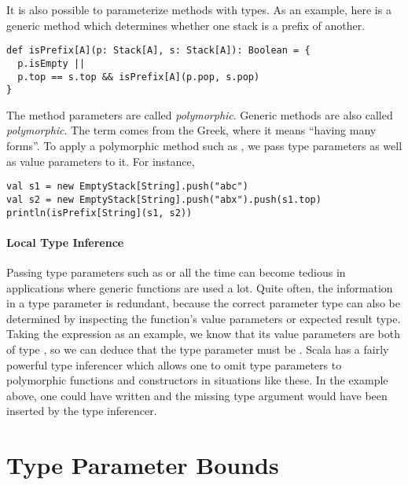 It is also possible to parameterize methods with types. As an example,
here is a generic method which determines whether one stack is a
prefix of another.
\begin{lstlisting}
def isPrefix[A](p: Stack[A], s: Stack[A]): Boolean = {
  p.isEmpty ||
  p.top == s.top && isPrefix[A](p.pop, s.pop)
}
\end{lstlisting}
The method parameters are called {\em polymorphic}.  Generic methods are
also called {\em polymorphic}.  The term comes from the Greek, where it
means ``having many forms''.  To apply a polymorphic method such as
, we pass type parameters as well as value parameters
to it. For instance,
\begin{lstlisting}
val s1 = new EmptyStack[String].push("abc")
val s2 = new EmptyStack[String].push("abx").push(s1.top)
println(isPrefix[String](s1, s2))
\end{lstlisting}

\paragraph{Local Type Inference}
Passing type parameters such as \code{[Int]} or \code{[String]} all
the time can become tedious in applications where generic functions
are used a lot. Quite often, the information in a type parameter is
redundant, because the correct parameter type can also be determined
by inspecting the function's value parameters or expected result type.
Taking the expression  as an
example, we know that its value parameters are both of type
, so we can deduce that the type parameter must
be . Scala has a fairly powerful type inferencer which
allows one to omit type parameters to polymorphic functions and
constructors in situations like these.  In the example above, one
could have written  and the missing type argument
\code{[String]} would have been inserted by the type inferencer. 

\section{Type Parameter Bounds}

